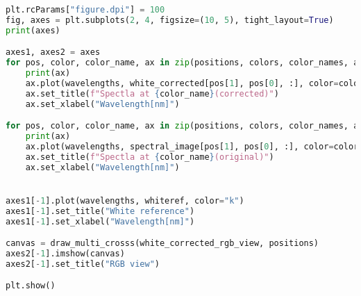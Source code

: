 \begin{lstlisting}[language=python, caption=White correction for Nuance Cmaera with small reference, label={code:wc-nuance-small}]
plt.rcParams["figure.dpi"] = 100
fig, axes = plt.subplots(2, 4, figsize=(10, 5), tight_layout=True)
print(axes)

axes1, axes2 = axes
for pos, color, color_name, ax in zip(positions, colors, color_names, axes2):
    print(ax)
    ax.plot(wavelengths, white_corrected[pos[1], pos[0], :], color=color)
    ax.set_title(f"Spectla at {color_name}(corrected)")
    ax.set_xlabel("Wavelength[nm]")

for pos, color, color_name, ax in zip(positions, colors, color_names, axes1):
    print(ax)
    ax.plot(wavelengths, spectral_image[pos[1], pos[0], :], color=color)
    ax.set_title(f"Spectla at {color_name}(original)")
    ax.set_xlabel("Wavelength[nm]")


axes1[-1].plot(wavelengths, whiteref, color="k")
axes1[-1].set_title("White reference")
axes1[-1].set_xlabel("Wavelength[nm]")

canvas = draw_multi_crosss(white_corrected_rgb_view, positions)
axes2[-1].imshow(canvas)
axes2[-1].set_title("RGB view")

plt.show()
\end{lstlisting}